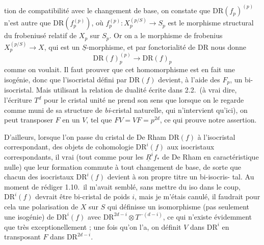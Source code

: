 \documentclass[11pt,a4paper]{article}
\begin{document}
tion de compatibilité avec le changement de base, on constate que
$\mathrm{DR}(f_p)^{(p)}$ \struck{\ill{}} n'est autre que
$\mathrm{DR}(f_p^{(p)})$, où $f_p^{(p)}\colon X_p^{(p/S)}\to S_p$ est le
morphisme structural du frobeniusé relatif de $X_p$ sur $S_p$. Or on a le
morphisme de frobenius $X_p^{(p/S)}\to X$, qui est un
$\underline{S}$-morphisme, et par fonctorialité de $\mathrm{DR}$ nous donne
\[
  \mathrm{DR}(f)_p^{(p)}\longrightarrow\mathrm{DR}(f)_p
\]
comme on voulait. Il faut prouver que cet homomorphisme est en
fait une isogénie, donc que l'isocristal défini par
$\mathrm{DR}(f)$ devient, à l'aide des $F_p$, un bi-isocristal. Mais utilisant la relation de
dualité écrite dans 2.2.\ (à vrai dire, l'écriture $T^d$ pour le cristal unité
ne prend son sens que lorsque on le regarde comme muni de sa structure de
\emph{bi}-cristal naturelle, qui n'intervient qu'ici), on peut transposer $F$
en un $V$, tel que $FV=VF=p^{2d}$, ce qui prouve notre assertion.

D'ailleurs, lorsque l'on passe du cristal de De Rham $\mathrm{DR}(f)$ à
l'isocristal correspondant,  des objets de cohomologie
$\mathrm{DR}^i(f)$ aux isocristaux correspondants, \struck{\ill{}} il
\struck{\ill{}}  vrai (tout comme pour les
$\underline{R}^if_*$ de De Rham en caractéristique nulle) que leur formation
commute à tout changement de base, de sorte que chacun des isocristaux
$\mathrm{DR}^i(f)$ devient à son propre titre un bi-isocris-
tal. Au moment de rédiger 1.10.\ il m'avait semblé, sans mettre du
iso dans le coup,  $\mathrm{DR}^i(f)$ devrait être 
bi-cristal de poids $i$, mais je m'étais canulé, il faudrait pour cela une
polarisation de $X$ sur $S$ qui définisse un isomorphisme (pas seulement une
isogénie) de $\mathrm{DR}^i(f)$ avec $\mathrm{DR}^{2d-i}\otimes T^{-(d-i)}$,
ce qui n'existe évidemment que très exceptionellement ; une fois qu'on l'a, on
définit $V$ dans $\mathrm{DR}^i$ en transposant $F$ dans
$\mathrm{DR}^{2d-i}$.
\end{document}
